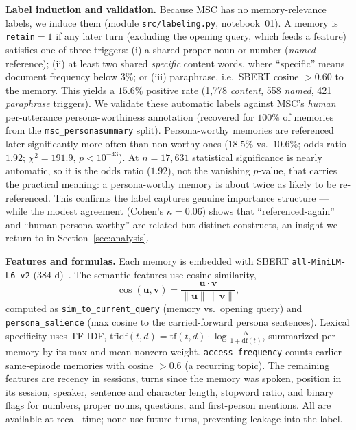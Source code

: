 \documentclass[11pt]{article}
\begin{document}
\textbf{Label induction and validation.} Because MSC has no memory-relevance
labels, we induce them (module \texttt{src/labeling.py}, notebook~01). A memory is
\texttt{retain}$=1$ if any later turn (excluding the opening query, which feeds a
feature) satisfies one of three triggers: (i) a shared proper noun or number
(\emph{named} reference); (ii) at least two shared \emph{specific} content words,
where ``specific'' means document frequency below $3\%$; or (iii) paraphrase, i.e.\
SBERT cosine $>0.60$ to the memory. This yields a $15.6\%$ positive rate
(1{,}778 \emph{content}, 558 \emph{named}, 421 \emph{paraphrase} triggers). We
validate these automatic labels against MSC's \emph{human} per-utterance
persona-worthiness annotation (recovered for $100\%$ of memories from the
\texttt{msc\_personasummary} split). Persona-worthy memories are referenced later
significantly more often than non-worthy ones ($18.5\%$ vs.\ $10.6\%$; odds ratio
$1.92$; $\chi^2=191.9$, $p<10^{-43}$). At $n=17{,}631$ statistical significance is
nearly automatic, so it is the odds ratio ($1.92$), not the vanishing $p$-value,
that carries the practical meaning: a persona-worthy memory is about twice as
likely to be re-referenced. This confirms the label captures genuine importance
structure --- while the modest agreement (Cohen's $\kappa=0.06$) shows that
``referenced-again'' and ``human-persona-worthy'' are related but distinct
constructs, an insight we return to in Section~\ref{sec:analysis}.

\textbf{Features and formulas.} Each memory is embedded with SBERT
\texttt{all-MiniLM-L6-v2} ($384$-d)~\cite{sbert}. The semantic features use cosine
similarity,
\begin{equation}
\cos(\mathbf{u},\mathbf{v}) = \frac{\mathbf{u}\cdot\mathbf{v}}{\lVert\mathbf{u}\rVert\,\lVert\mathbf{v}\rVert},
\end{equation}
computed as \texttt{sim\_to\_current\_query} (memory vs.\ opening query) and
\texttt{persona\_salience} (max cosine to the carried-forward persona sentences).
Lexical specificity uses TF-IDF, $\text{tfidf}(t,d)=\text{tf}(t,d)\cdot
\log\frac{N}{1+\text{df}(t)}$, summarized per memory by its max and mean nonzero
weight. \texttt{access\_frequency} counts earlier same-episode memories with
cosine $>0.6$ (a recurring topic). The remaining features are recency in sessions,
turns since the memory was spoken, position in its session, speaker, sentence and
character length, stopword ratio, and binary flags for numbers, proper nouns,
questions, and first-person mentions. All are available at recall time; none use
future turns, preventing leakage into the label.
\end{document}
